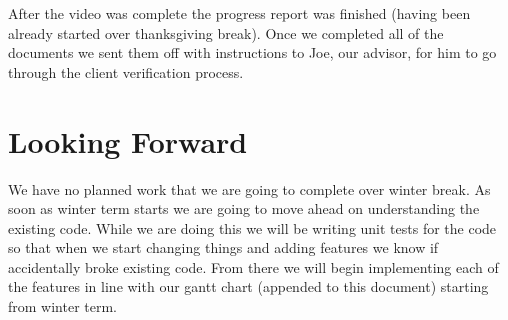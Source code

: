 \documentclass[draftclsnofoot,onecolumn,journal,letterpaper,compsoc,10pt]{IEEEtran}
\begin{document}
    After the video was complete the progress report was finished (having been already started over thanksgiving break).  Once we completed all of the documents we sent them off with instructions to Joe, our advisor, for him to go through the client verification process.
    
    
\section{Looking Forward}
We have no planned work that we are going to complete over winter break.  As soon as winter term starts we are going to move ahead on understanding the existing code.  While we are doing this we will be writing unit tests for the code so that when we start changing things and adding features we know if accidentally broke existing code.  From there we will begin implementing each of the features in line with our gantt chart (appended to this document) starting from winter term.


\end{document}
